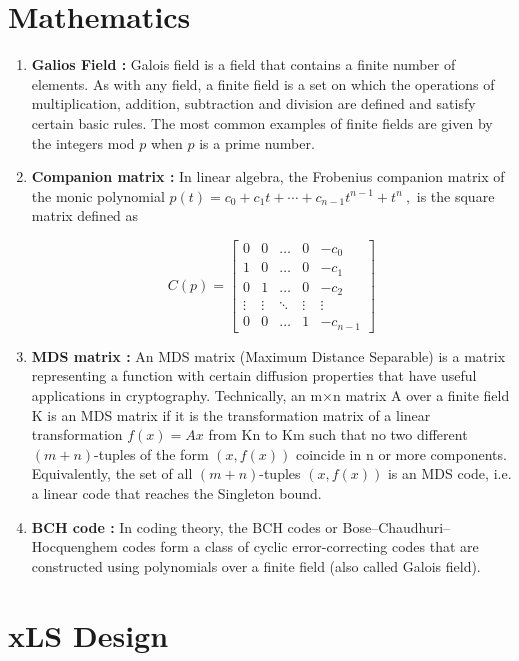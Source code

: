 \documentclass[preprint]{transcrypto}
\begin{document}
\section{Mathematics}
\label{sec:math}
\begin{enumerate}
    \item \textbf{Galios Field :} Galois field is a field that contains a finite number of elements. As with any field, a finite field is a set on which the operations of multiplication, addition, subtraction and division are defined and satisfy certain basic rules. The most common examples of finite fields are given by the integers mod $p$ when $p$ is a prime number.
    \item \textbf{Companion matrix :} In linear algebra, the Frobenius companion matrix of the monic polynomial
${\displaystyle p(t)=c_{0}+c_{1}t+\cdots +c_{n-1}t^{n-1}+t^{n}~,}$
is the square matrix defined as

     $$ C(p)={\begin{bmatrix}0&0&\dots &0&-c_{0}\\1&0&\dots &0&-c_{1}\\0&1&\dots &0&-c_{2}\\\vdots &\vdots &\ddots &\vdots &\vdots \\0&0&\dots &1&-c_{{n-1}}\end{bmatrix}} $$



    \item \textbf{MDS matrix :} An MDS matrix (Maximum Distance Separable) is a matrix representing a function with certain diffusion properties that have useful applications in cryptography. Technically, an m×n matrix A over a finite field K is an MDS matrix if it is the transformation matrix of a linear transformation $f(x)=Ax$ from Kn to Km such that no two different $(m+n)$-tuples of the form $(x,f(x))$ coincide in n or more components. Equivalently, the set of all $(m+n)$-tuples $(x,f(x))$ is an MDS code, i.e. a linear code that reaches the Singleton bound.
    \item \textbf{BCH code :} In coding theory, the BCH codes or Bose–Chaudhuri–Hocquenghem codes form a class of cyclic error-correcting codes that are constructed using polynomials over a finite field (also called Galois field).
    
\end{enumerate}
 
\section{xLS Design}
\label{sec:xLS}
\end{document}
